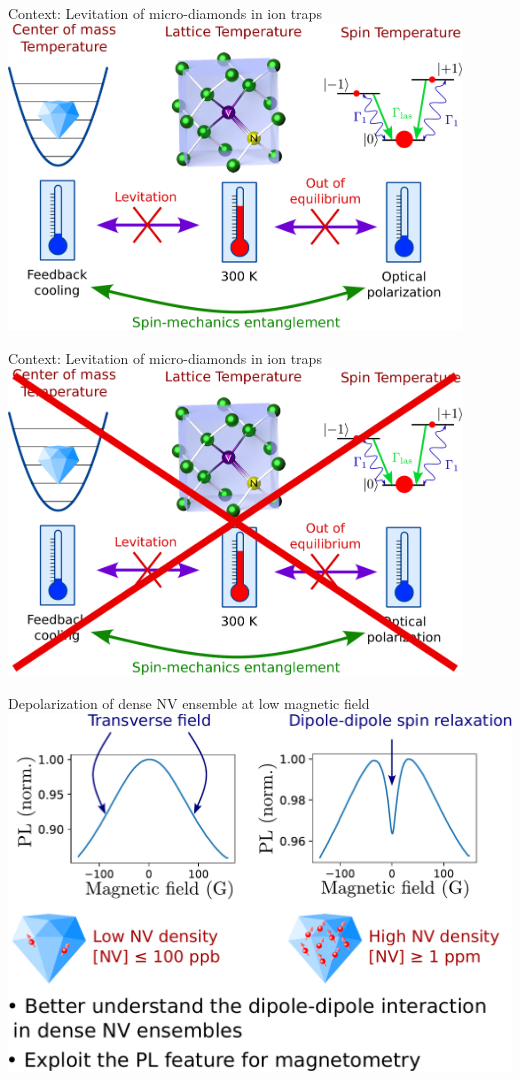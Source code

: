 \documentclass{beamer}
\begin{document}
\begin{frame}{Context: Levitation of micro-diamonds in ion traps}
\centering
\includegraphics[width=0.9\textwidth,height=0.9\textheight,keepaspectratio]{Shema_meca}
\end{frame}

\begin{frame}{Context: Levitation of micro-diamonds in ion traps}
\centering
\includegraphics[width=0.9\textwidth,height=0.9\textheight,keepaspectratio]{Shema_meca_barre}
\end{frame}

\begin{frame}{Depolarization of dense NV ensemble at low magnetic field}
\centering
\includegraphics[width=\textwidth,height=0.9\textheight,keepaspectratio]{slide_presentation_sujet}
\end{frame}
\end{document}
